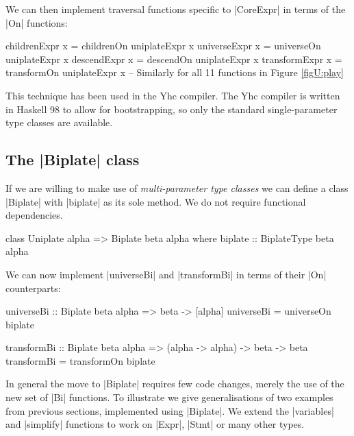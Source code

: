 \begin{example}

We can then implement traversal functions specific to |CoreExpr| in terms of the |On| functions:

\begin{code}
childrenExpr   x = childrenOn   uniplateExpr x
universeExpr   x = universeOn   uniplateExpr x
descendExpr    x = descendOn    uniplateExpr x
transformExpr  x = transformOn  uniplateExpr x
-- Similarly for all 11 functions in Figure \ref{figU:play}
\end{code}\codeexample
\end{example}
\bigskip

This technique has been used in the Yhc compiler. The Yhc compiler is written in Haskell 98 to allow for bootstrapping, so only the standard single-parameter type classes are available.

\subsection{The |Biplate| class}

If we are willing to make use of \textit{multi-parameter type classes} \cite{jones:mptc} we can define a class |Biplate| with |biplate| as its sole method. We do not require functional dependencies.

\begin{code}
class  Uniplate alpha => Biplate beta alpha where
       biplate :: BiplateType beta alpha
\end{code}

We can now implement |universeBi| and |transformBi| in terms of their |On| counterparts:

\begin{code}
universeBi :: Biplate beta alpha => beta -> [alpha]
universeBi = universeOn biplate

transformBi :: Biplate beta alpha => (alpha -> alpha) -> beta -> beta
transformBi = transformOn biplate
\end{code}

In general the move to |Biplate| requires few code changes, merely the use of the new set of |Bi| functions. To illustrate we give generalisations of two examples from previous sections, implemented using |Biplate|. We extend the |variables| and |simplify| functions to work on |Expr|, |Stmt| or many other types.

